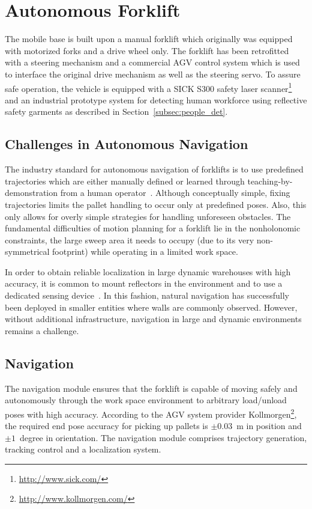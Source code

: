 \section{Autonomous Forklift}
\label{sec:agv}
%
The mobile base is built upon a manual forklift which originally was equipped with motorized forks
and a drive wheel only. The forklift has been retrofitted with a steering mechanism and a commercial
AGV control system which is used to interface the original drive mechanism as well as the steering
servo. To assure safe operation, the vehicle is equipped with a SICK S300 safety laser
scanner\footnote{\url{http://www.sick.com/}} and an industrial prototype system for detecting human
workforce using reflective safety garments as described in Section~\ref{subsec:people_det}.
%
\subsection{Challenges in Autonomous Navigation}
\label{subsec:AGV_challenges}
%
The industry standard for autonomous navigation of forklifts is to use predefined trajectories which
are either manually defined or learned through teaching-by-demonstration from a human
operator~\cite{Hell06, Marsh08}. Although conceptually simple, fixing trajectories limits the pallet
handling to occur only at predefined poses. Also, this only allows for overly simple strategies for
handling unforeseen obstacles. The fundamental difficulties of motion planning for a forklift lie in
the nonholonomic constraints, the large sweep area it needs to occupy (due to its very
non-symmetrical footprint) while operating in a limited work space.

In order to obtain reliable localization in large dynamic warehouses with high accuracy, it is
common to mount reflectors in the environment and to use a dedicated sensing
device~\cite{Hyyp89}. In this fashion, natural navigation has successfully been deployed in smaller
entities where walls are commonly observed. However, without additional infrastructure, navigation
in large and dynamic environments remains a challenge.
%
\subsection{Navigation}
\label{subsec:navigation}
%
The navigation module ensures that the forklift is capable of moving safely and autonomously through
the work space environment to arbitrary load/unload poses with high accuracy. According to the AGV
system provider Kollmorgen\footnote{\url{http://www.kollmorgen.com/}}, the required end pose
accuracy for picking up pallets is $\pm0.03$~m in position and $\pm1$~degree in orientation. The
navigation module comprises trajectory generation, tracking control and a localization system.
 
